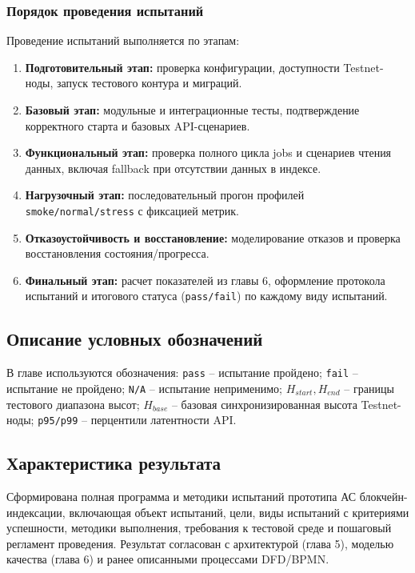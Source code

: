 ﻿\documentclass[14pt,a4paper]{extarticle}
\begin{document}
\subsubsection{Порядок проведения испытаний}
\noindent Проведение испытаний выполняется по этапам:
\begin{enumerate}
  \item \textbf{Подготовительный этап:} проверка конфигурации, доступности Testnet-ноды, запуск тестового контура и миграций.
  \item \textbf{Базовый этап:} модульные и интеграционные тесты, подтверждение корректного старта и базовых API-сценариев.
  \item \textbf{Функциональный этап:} проверка полного цикла jobs и сценариев чтения данных, включая fallback при отсутствии данных в индексе.
  \item \textbf{Нагрузочный этап:} последовательный прогон профилей \texttt{smoke/normal/stress} с фиксацией метрик.
  \item \textbf{Отказоустойчивость и восстановление:} моделирование отказов и проверка восстановления состояния/прогресса.
  \item \textbf{Финальный этап:} расчет показателей из главы 6, оформление протокола испытаний и итогового статуса (\texttt{pass/fail}) по каждому виду испытаний.
\end{enumerate}

\subsection{Описание условных обозначений}
\noindent В главе используются обозначения: \texttt{pass} -- испытание пройдено; \texttt{fail} -- испытание не пройдено; \texttt{N/A} -- испытание неприменимо; $H_{start}, H_{end}$ -- границы тестового диапазона высот; $H_{base}$ -- базовая синхронизированная высота Testnet-ноды; \texttt{p95/p99} -- перцентили латентности API.

\subsection{Характеристика результата}
\noindent Сформирована полная программа и методики испытаний прототипа АС блокчейн-индексации, включающая объект испытаний, цели, виды испытаний с критериями успешности, методики выполнения, требования к тестовой среде и пошаговый регламент проведения. Результат согласован с архитектурой (глава 5), моделью качества (глава 6) и ранее описанными процессами DFD/BPMN.
\end{document}
